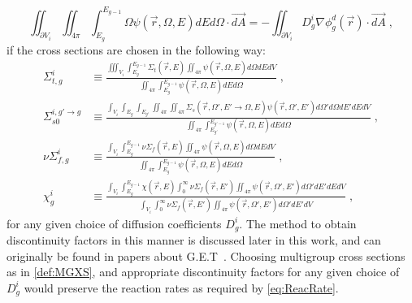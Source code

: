 \documentclass[a4paper,letterpaper,12pt,oneside,draft]{article}
\newcommand{\eec}{\;,}
\newcommand{\intg}[2][g]{\ensuremath{\int_{E_{#1}}^{E_{#1-1}} #2 dE}}
\newcommand{\vr}{\ensuremath{\vec{r}}}
\newcommand{\psif}[1][]{\psi(\vr,\Omega#1,E#1)}
\begin{document}
    \begin{equation}
    \label{eq:GET}
        \iint_{\partial V_i}\iint_{4\pi}\intg{\Omega\psif} d\Omega\cdot\vec{dA} = -\iint_{\partial V_i}D_g^i\nabla\phi_g^d(\vr) \cdot\vec{dA} \eec
    \end{equation}
    if the cross sections are chosen in the following way:
    \begin{align}
    \label{def:MGXS}
        \Sigma_{t,g}^i &\equiv \frac{\iiint_{V_i}\intg{\Sigma_{t}(\vr,E)\iint_{4\pi}\psif d\Omega}dV}{\iint_{4\pi}\intg{\psif}d\Omega} \eec\\\nonumber
        \Sigma_{s0}^{i,g'\to g} &\equiv \frac{\int_{V_i}\int_{E_g}\int_{E_{g'}}\iint_{4\pi}\iint_{4\pi} \Sigma_{s}(\vr,\Omega',E'\to\Omega,E) \psif['] d\Omega'd\Omega dE'dEdV}{\iint_{4\pi}\intg[g']{\psif}d\Omega} \eec\\\nonumber
        \nu\Sigma_{f,g}^i &\equiv \frac{\int_{V_i}\intg{\nu\Sigma_{f}(\vr,E)\iint_{4\pi}\psif d\Omega}dV}{\iint_{4\pi}\intg{\psif}d\Omega}\eec \\\nonumber
        \chi_g^i &\equiv \frac{\int_{V_i}\intg{\chi(\vr,E)\int_0^\infty\nu\Sigma_{f}(\vr,E')\iint_{4\pi}\psif['] d\Omega'dE'}dV}{\int_{V_i}\int_0^\infty\nu\Sigma_{f}(\vr,E')\iint_{4\pi}\psif['] d\Omega'dE'dV} \eec
    \end{align}
    for any given choice of diffusion coefficients $D_g^i$.
    The method to obtain discontinuity factors in this manner is discussed later in this work, and can originally be found in papers about G.E.T~\cite{SmithHomogenization}.
    Choosing multigroup cross sections as in \cref{def:MGXS}, and appropriate discontinuity factors for any given choice of $D_g^i$ would preserve the reaction rates as required by \cref{eq:ReacRate}.
    
\end{document}
